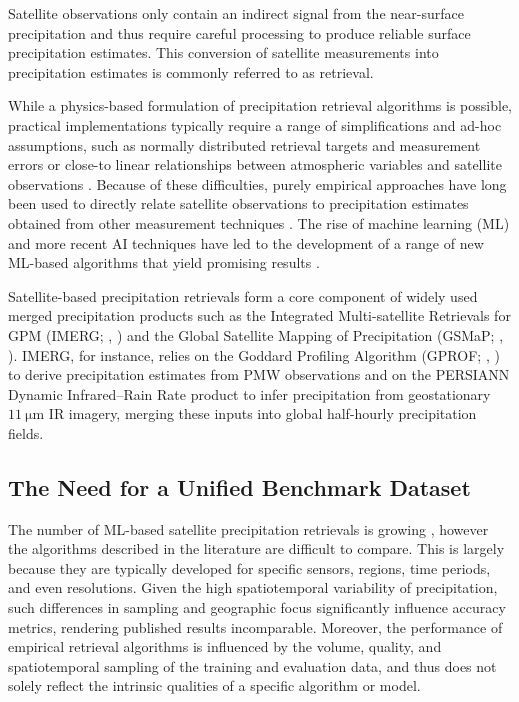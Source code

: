 \documentclass[11pt]{article}
\begin{document}
Satellite observations only contain an indirect signal from the near-surface
precipitation and thus require careful processing to produce reliable surface
precipitation estimates. This conversion of satellite measurements into
precipitation estimates is commonly referred to as retrieval.

While a physics-based formulation of precipitation retrieval algorithms is
possible, practical implementations typically require a range of simplifications
and ad-hoc assumptions, such as normally distributed retrieval targets and
measurement errors or close-to linear relationships between atmospheric
variables and satellite observations \citep{Boukabara2011MiRS,
  Kummerow2015GPROF, Maahn2020OptimalEstimation}. Because of these difficulties,
purely empirical approaches have long been used to directly relate satellite
observations to precipitation estimates obtained from other measurement
techniques \citep{ Griffith1978RainEstimation, Adler1988InfraredRainfall,
  Hong2004Precipitation}. The rise of machine learning (ML) and more recent AI
techniques have led to the development of a range of new ML-based algorithms
that yield promising results \citep{Sadeghi2019Persiann,
  Pfreundschuh2022BrazilRetrieval, Pfreundschuh2022Gprof, Gorooh2023LEOGEO}.

Satellite-based precipitation retrievals form a core component of widely used
merged precipitation products such as the Integrated Multi-satellite Retrievals
for GPM (IMERG; \citeauthor{Huffman2020Integrated},
\citeyear{Huffman2020Integrated}) and the Global Satellite Mapping of
Precipitation (GSMaP; \citeauthor{Kubota2020Global},
\citeyear{Kubota2020Global}). IMERG, for instance, relies on the Goddard
Profiling Algorithm (GPROF; \citeauthor{Kummerow2015GPROF},
\citeyear{Kummerow2015GPROF}) to derive precipitation estimates from PMW
 observations and on the PERSIANN Dynamic Infrared–Rain Rate product
\citep{Nguyen2020PDIRNow} to infer precipitation from geostationary
$\SI{11}{\micro\meter}$ IR imagery, merging these inputs into global
half-hourly precipitation fields.

\subsection{The Need for a Unified Benchmark Dataset}

The number of ML-based satellite precipitation retrievals is
growing \citep{Sano2018PNPR, Amell2025Probabilistic}, however the algorithms
described in the literature are difficult to compare. This is largely because
they are typically developed for specific sensors, regions, time periods, and
even resolutions. Given the high spatiotemporal variability of precipitation,
such differences in sampling and geographic focus significantly influence
accuracy metrics, rendering published results incomparable. Moreover, the
performance of empirical retrieval algorithms is influenced by the volume,
quality, and spatiotemporal sampling of the training and evaluation data, and
thus does not solely reflect the intrinsic qualities of a specific algorithm or
model.
\end{document}
